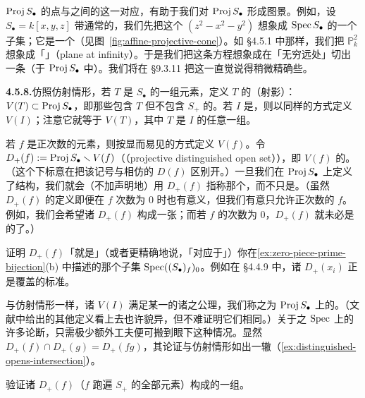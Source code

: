 $\operatorname{Proj} S_\bullet$ 的点与\trHomogeneous\trPrimeIdeal{}之间的这一对应，有助于我们对 $\operatorname{Proj} S_\bullet$ 形成图景。例如，设 $S_\bullet=k[x,y,z]$ 带通常的\trGrading，我们先把这个\trHomogeneous\trPrimeIdeal{} $(z^2-x^2-y^2)$ 想象成 $\operatorname{Spec} S_\bullet$ 的一个子集；它是一个\trCone（见图~\ref{fig:affine-projective-cone}）。如 \S4.5.1 中那样，我们把 $\mathbb{P}^2_k$ 想象成「\trPlaneAtInfinity」（plane at infinity）。于是我们把这条方程想象成在「无穷远处」切出一条\trConic（于 $\operatorname{Proj} S_\bullet$ 中）。我们将在 \S9.3.11 把这一直觉说得稍微精确些。

\textbf{4.5.8.}\quad 仿照仿射情形，若 $T$ 是 $S_\bullet$ 的一组\trHomogeneous{}元素，定义 $T$ 的（射影）\textbf{\trVanishingSet}：$V(T)\subset\operatorname{Proj} S_\bullet$，即那些包含 $T$ 但不包含 $S_+$ 的\trHomogeneous\trPrimeIdeal。若 $I$ 是\trHomogeneous\trIdeal，则以同样的方式定义 $V(I)$；注意它就等于 $V(T)$，其中 $T$ 是 $I$ 的任意一组\trHomogeneous\trGenerator。

若 $f$ 是正次数的\trHomogeneous{}元素，则按显而易见的方式定义 $V(f)$。令 $D_+(f):=\operatorname{Proj} S_\bullet\smallsetminus V(f)$（\textbf{\trProjective\trDistinguishedOpen}（projective distinguished open set）），即 $V(f)$ 的\trComplement。（这个下标意在把该记号与相仿的 $D(f)$ 区别开。）一旦我们在 $\operatorname{Proj} S_\bullet$ 上定义了\trScheme{}结构，我们就会（不加声明地）用 $D_+(f)$ 指称那个\trOpenSubscheme，而不只是\trOpenSubset。（虽然 $D_+(f)$ 的定义即便在 $f$ 次数为 $0$ 时也有意义，但我们有意只允许正次数的 $f$。例如，我们会希望诸 $D_+(f)$ 构成一张\trAffine\trCover；而若 $f$ 的次数为 $0$，$D_+(f)$ 就未必是\trAffine{}的了。）

\begin{exercise}\label{ex:d-plus-is-spec}
证明 $D_+(f)$「就是」（或者更精确地说，「对应于」）你在\cref{ex:zero-piece-prime-bijection}(b) 中描述的那个子集 $\operatorname{Spec}((S_\bullet)_f)_0$。例如在 \S4.4.9 中，诸 $D_+(x_i)$ 正是覆盖\trProjectiveSpace{}的标准\trOpenSet。
\end{exercise}

与仿射情形一样，诸 $V(I)$ 满足某一\trTopology{}的诸\trClosedSet{}之公理，我们称之为 $\operatorname{Proj} S_\bullet$ 上的\textbf{\trZariskiTopology}。（文献中给出的其他定义看上去也许貌异，但不难证明它们相同。）关于\trRing{}之 $\operatorname{Spec}$ 上\trZariskiTopology{}的许多论断，只需极少额外工夫便可搬到眼下这种情况。显然 $D_+(f)\cap D_+(g)=D_+(fg)$，其论证与仿射情形如出一辙（\cref{ex:distinguished-opens-intersection}）。

\begin{exercise}[容易的练习]\label{ex:d-plus-base}
验证诸\trProjective\trDistinguishedOpen{} $D_+(f)$（$f$ 跑遍 $S_+$ 的全部\trHomogeneous{}元素）构成\trZariskiTopology{}的一组\trBase。
\end{exercise}

